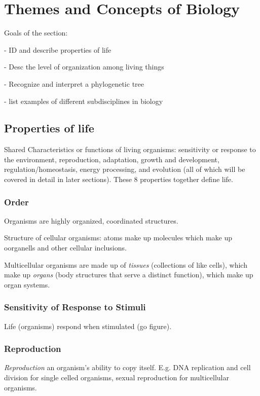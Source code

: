 \documentclass{article}
\theoremstyle{definition}
\begin{document}
\section{Themes and Concepts of Biology}
Goals of the section:

- ID and describe properties of life

- Desc the level of organization among living things

- Recognize and interpret a phylogenetic tree

- list examples of different subdisciplines in biology

\subsection{Properties of life}

Shared Characteristics or functions of living organisms: sensitivity or response to the environment,
reproduction, adaptation, growth and development, regulation/homeostasis, energy processing, and evolution (all of which will be covered in detail in later sections). These 8 properties together define life.

\subsubsection{Order}
Organisms are highly organized, coordinated structures.

Structure of cellular organisms: atoms make up molecules which make up oorganells and other cellular inclusions.

Multicellular organisms are made up of \textit{tissues} (collections of like cells), which make up \textit{organs} (body structures that serve a distinct function), which make up organ systems.

\subsubsection{Sensitivity of Response to Stimuli}

Life (organisms) respond when stimulated (go figure).

\subsubsection{Reproduction}

 \textit{Reproduction}
an organism's ability to copy itself. E.g. DNA replication and cell division for single celled organisms, sexual reproduction for multicellular organisms.
\end{document}
